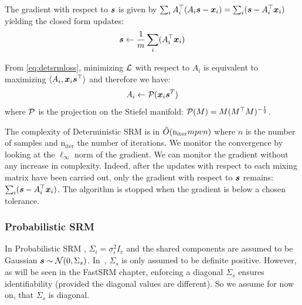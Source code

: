 The gradient with respect to $\boldsymbol{s}$ is given by $ \sum_i A_i^{\top}(A_i \boldsymbol{s} -
\boldsymbol{x}_i) = \sum_i (\boldsymbol{s} -
A_i^{\top} \boldsymbol{x}_i)$
yielding the closed form updates:
\begin{equation}
  \boldsymbol{s} \leftarrow  \frac1m \sum_i (A_i^{\top} \boldsymbol{x}_i)
  \label{eq:srm:supdate}
\end{equation}

From \eqref{eq:detsrmloss}, minimizing $\mathcal{L}$ with respect to $A_i$ is
equivalent to maximizing $\langle A_i, \boldsymbol{x}_i \boldsymbol{s}^{\top} \rangle$ and therefore we
have:
\begin{equation}
  A_i \leftarrow  \mathcal{P}(\boldsymbol{x}_i \boldsymbol{s}^T)
  \label{eq:detsrm:Aiupdate}
\end{equation}
where $\mathcal{P}$ is the projection on the Stiefel manifold: $\mathcal{P}(M) = M
(M^{\top}M)^{-\frac12}$.

The complexity of Deterministic SRM is in $\tilde{O}(\mathrm{n_{iter}} mpvn)$ where
$n$ is the number of samples and $\mathrm{n_{iter}}$ the number of iterations.
We monitor the convergence by looking at the $\ell_{\infty}$ norm of the
gradient. We can monitor the gradient without any increase in complexity.
Indeed, after the updates with respect to each mixing matrix have been
carried out, only the gradient with respect to $\boldsymbol{s}$ remains: $\sum_i
(\boldsymbol{s} - A_i^{\top}\boldsymbol{x}_i)$. The algorithm is stopped when the
gradient is below a chosen tolerance.

\subsubsection{Probabilistic SRM}
\label{sec:probabilisticsrm}
In Probabilistic SRM , $\Sigma_i=\sigma_i^2 I_v$ and the shared
components are assumed to be Gaussian $\boldsymbol{s} \sim \mathcal{N}(0, \Sigma_s)$.
In~\cite{chen2015reduced}, $\Sigma_s$ is only assumed to be definite positive. However,
as will be seen in the FastSRM chapter, enforcing a diagonal $\Sigma_s$ ensures
identifiability (provided the diagonal values are different). So we assume for
now on, that $\Sigma_s$ is diagonal.

